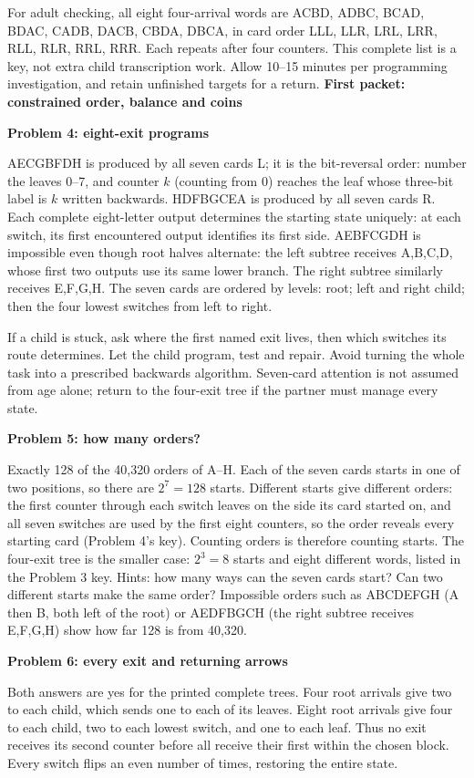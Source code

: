 \documentclass[11pt]{article}
\newcommand{\head}[1]{\vspace{3pt}\textbf{\large #1}\par}
\newcommand{\prob}[1]{\vspace{3pt}\textbf{#1}\par}
\begin{document}
For adult checking, all eight four-arrival words are ACBD, ADBC, BCAD, BDAC, CADB, DACB, CBDA, DBCA, in card order LLL, LLR, LRL, LRR, RLL, RLR, RRL, RRR. Each repeats after four counters. This complete list is a key, not extra child transcription work. Allow 10--15 minutes per programming investigation, and retain unfinished targets for a return.
\newpage
\head{First packet: constrained order, balance and coins}
\prob{Problem 4: eight-exit programs}
AECGBFDH is produced by all seven cards L; it is the bit-reversal order: number the leaves 0--7, and counter $k$ (counting from 0) reaches the leaf whose three-bit label is $k$ written backwards. HDFBGCEA is produced by all seven cards R. Each complete eight-letter output determines the starting state uniquely: at each switch, its first encountered output identifies its first side. AEBFCGDH is impossible even though root halves alternate: the left subtree receives A,B,C,D, whose first two outputs use its same lower branch. The right subtree similarly receives E,F,G,H. The seven cards are ordered by levels: root; left and right child; then the four lowest switches from left to right.

If a child is stuck, ask where the first named exit lives, then which switches its route determines. Let the child program, test and repair. Avoid turning the whole task into a prescribed backwards algorithm. Seven-card attention is not assumed from age alone; return to the four-exit tree if the partner must manage every state.

\prob{Problem 5: how many orders?}
Exactly 128 of the 40,320 orders of A--H. Each of the seven cards starts in one of two positions, so there are $2^7=128$ starts. Different starts give different orders: the first counter through each switch leaves on the side its card started on, and all seven switches are used by the first eight counters, so the order reveals every starting card (Problem 4's key). Counting orders is therefore counting starts. The four-exit tree is the smaller case: $2^3=8$ starts and eight different words, listed in the Problem 3 key. Hints: how many ways can the seven cards start? Can two different starts make the same order? Impossible orders such as ABCDEFGH (A then B, both left of the root) or AEDFBGCH (the right subtree receives E,F,G,H) show how far 128 is from 40,320.

\prob{Problem 6: every exit and returning arrows}
Both answers are yes for the printed complete trees. Four root arrivals give two to each child, which sends one to each of its leaves. Eight root arrivals give four to each child, two to each lowest switch, and one to each leaf. Thus no exit receives its second counter before all receive their first within the chosen block. Every switch flips an even number of times, restoring the entire state.
\end{document}
